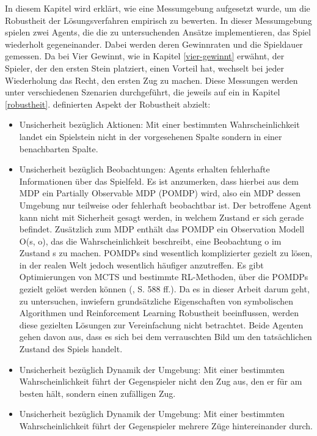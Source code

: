 In diesem Kapitel wird erklärt, wie eine Messumgebung aufgesetzt wurde, um die Robustheit
der Lösungsverfahren empirisch zu bewerten. In dieser Messumgebung spielen zwei Agents, die die zu untersuchenden Ansätze implementieren, das Spiel wiederholt gegeneinander. Dabei werden deren Gewinnraten und die Spieldauer gemessen. Da bei Vier Gewinnt, wie in Kapitel \ref{vier-gewinnt} erwähnt, der Spieler, der den ersten Stein platziert, einen Vorteil hat, wechselt bei jeder Wiederholung das Recht, den ersten Zug zu machen. Diese Messungen werden unter verschiedenen Szenarien durchgeführt, die jeweils auf ein in Kapitel \ref{robustheit}. definierten Aspekt der Robustheit abzielt:

\begin{itemize}
	\item Unsicherheit bezüglich Aktionen: Mit einer bestimmten Wahrscheinlichkeit landet ein Spielstein nicht in der vorgesehenen Spalte sondern in einer benachbarten Spalte.
	\item Unsicherheit bezüglich Beobachtungen: Agents erhalten fehlerhafte Informationen über das Spielfeld. Es ist anzumerken, dass hierbei aus dem MDP ein Partially Observable MDP (POMDP) wird, also ein MDP dessen Umgebung nur teilweise oder fehlerhaft beobachtbar ist. Der betroffene Agent kann nicht mit Sicherheit gesagt werden, in welchem Zustand er sich gerade befindet. Zusätzlich zum MDP enthält das POMDP ein Observation Modell O(s, o), das die Wahrscheinlichkeit beschreibt, eine Beobachtung o im Zustand s zu machen. POMDPs sind wesentlich komplizierter gezielt zu lösen, in der realen Welt jedoch wesentlich häufiger anzutreffen. Es gibt Optimierungen von MCTS und bestimmte RL-Methoden, über die POMDPs gezielt gelöst werden können (\cite{Russell.2020}, S. 588 ff.). Da es in dieser Arbeit darum geht, zu untersuchen, inwiefern grundsätzliche Eigenschaften von symbolischen Algorithmen und Reinforcement Learning Robustheit beeinflussen, werden diese gezielten Lösungen zur Vereinfachung nicht betrachtet. Beide Agenten gehen davon aus, dass es sich bei dem verrauschten Bild um den tatsächlichen Zustand des Spiels handelt.
	\item Unsicherheit bezüglich Dynamik der Umgebung: Mit einer bestimmten Wahrscheinlichkeit führt der Gegenspieler nicht den Zug aus, den er für am besten hält, sondern einen zufälligen Zug.
	\item Unsicherheit bezüglich Dynamik der Umgebung: Mit einer bestimmten Wahrscheinlichkeit führt der Gegenspieler mehrere Züge hintereinander durch.
\end{itemize}

